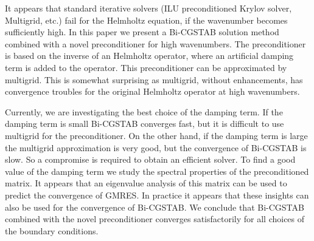 \documentclass{report}
\begin{document}
It appears that standard iterative solvers (ILU preconditioned
Krylov solver, Multigrid, etc.) fail for the Helmholtz equation, if the
wavenumber becomes sufficiently high. In this paper we
present a Bi-CGSTAB solution method combined with a
novel preconditioner for high wavenumbers. The preconditioner is based
on the inverse of an
Helmholtz operator, where an artificial damping term is added to the
operator. This preconditioner can
be approximated by multigrid. This is somewhat surprising as
multigrid, without
enhancements, has convergence troubles for the original Helmholtz
operator at high wavenumbers.

Currently, we are investigating the best choice of the damping
term. If the damping term is small Bi-CGSTAB
converges fast, but it is difficult to use multigrid for the
preconditioner. On the other hand, if the damping
term is large the multigrid approximation is very good, but the
convergence of Bi-CGSTAB is slow. So a compromise is required to
obtain an efficient solver. To find a good value of the damping term
we study the spectral properties of the preconditioned
matrix. It appears that an eigenvalue analysis of this matrix
can be used to predict
the convergence of GMRES. In practice it appears that these insights
can also be used for the convergence of Bi-CGSTAB.
We conclude that Bi-CGSTAB combined with the novel preconditioner
converges satisfactorily for all choices of the boundary conditions.
\end{document}
